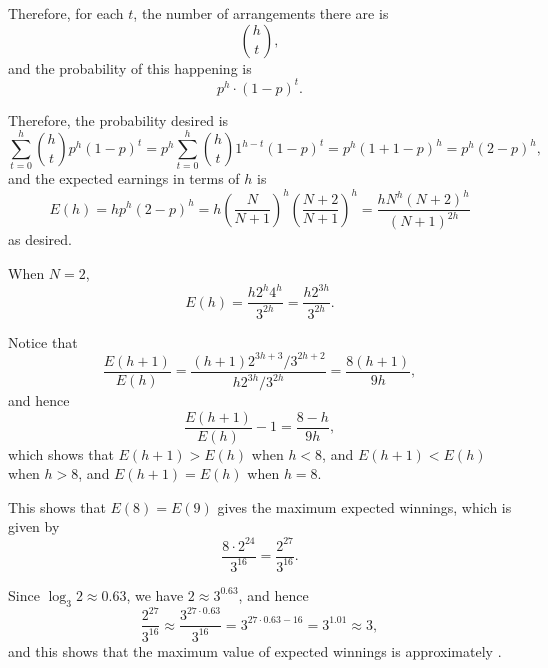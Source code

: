 \begin{enumerate}
          Therefore, for each \(t\), the number of arrangements there are is
          \[
              \binom{h}{t},
          \]
          and the probability of this happening is
          \[
              p^h \cdot (1 - p)^t.
          \]

          Therefore, the probability desired is
          \[
              \sum_{t = 0}^{h} \binom{h}{t} p^h (1 - p)^t = p^h \sum_{t = 0}^{h} \binom{h}{t} 1^{h - t} (1 - p)^t = p^h (1 + 1 - p)^h = p^h (2 - p)^h,
          \]
          and the expected earnings in terms of \(h\) is
          \[
              E(h) = h p^h (2 - p)^h = h \left(\frac{N}{N + 1}\right)^h \left(\frac{N + 2}{N + 1}\right)^h = \frac{h N^h (N + 2)^h}{(N + 1)^{2h}}
          \]
          as desired.

          When \(N = 2\),
          \[
              E(h) = \frac{h 2^h 4^h}{3^{2h}} = \frac{h 2^{3h}}{3^{2h}}.
          \]

          Notice that
          \[
              \frac{E(h + 1)}{E(h)} = \frac{(h + 1) 2^{3h + 3} / 3^{2h + 2}}{h 2^{3h} / 3^{2h}} = \frac{8(h + 1)}{9h},
          \]
          and hence
          \[
              \frac{E(h + 1)}{E(h)} - 1 = \frac{8 - h}{9h},
          \]
          which shows that \(E(h + 1) > E(h)\) when \(h < 8\), and \(E(h + 1) < E(h)\) when \(h > 8\), and \(E(h + 1) = E(h)\) when \(h = 8\).

          This shows that \(E(8) = E(9)\) gives the maximum expected winnings, which is given by
          \[
              \frac{8 \cdot 2^{24}}{3^{16}} = \frac{2^{27}}{3^{16}}.
          \]

          Since \(\log_3 2 \approx 0.63\), we have \(2 \approx 3^{0.63}\), and hence
          \[
              \frac{2^{27}}{3^{16}} \approx \frac{3^{27 \cdot 0.63}}{3^{16}} = 3^{27 \cdot 0.63 - 16} = 3^{1.01} \approx 3,
          \]
          and this shows that the maximum value of expected winnings is approximately .
\end{enumerate}